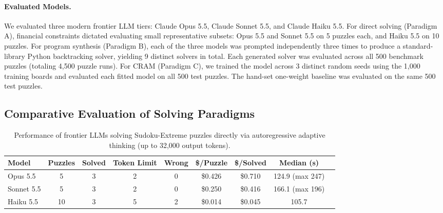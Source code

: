 \documentclass{article} %
\begin{document}
\paragraph{Evaluated Models.}
We evaluated three modern frontier LLM tiers: Claude Opus 5.5, Claude Sonnet 5.5, and Claude Haiku 5.5.
For direct solving (Paradigm A), financial constraints dictated evaluating small representative subsets: Opus 5.5 and Sonnet 5.5 on 5 puzzles each, and Haiku 5.5 on 10 puzzles.
For program synthesis (Paradigm B), each of the three models was prompted independently three times to produce a standard-library Python backtracking solver, yielding 9 distinct solvers in total. Each generated solver was evaluated across all 500 benchmark puzzles (totaling 4,500 puzzle runs).
For CRAM (Paradigm C), we trained the model across 3 distinct random seeds using the 1,000 training boards and evaluated each fitted model on all 500 test puzzles. The hand-set one-weight baseline was evaluated on the same 500 test puzzles.

\subsection{Comparative Evaluation of Solving Paradigms}
\label{sec:exp_comparison}

\begin{table}[t]
\caption{Performance of frontier LLMs solving Sudoku-Extreme puzzles directly via autoregressive adaptive thinking (up to 32,000 output tokens).}
\label{tab:llm_direct}
\begin{center}
\begin{tabular}{lcccccccc}
\toprule
\textbf{Model} & \textbf{Puzzles} & \textbf{Solved} & \textbf{Token Limit} & \textbf{Wrong} & \textbf{\$/Puzzle} & \textbf{\$/Solved} & \textbf{Median (s)} \\
\midrule
Opus 5.5   & 5  & 3 & 2 & 0 & \$0.426 & \$0.710 & 124.9 (max 247) \\
Sonnet 5.5 & 5  & 3 & 2 & 0 & \$0.250 & \$0.416 & 166.1 (max 196) \\
Haiku 5.5  & 10 & 3 & 5 & 2 & \$0.014 & \$0.045 & 105.7 \\
\bottomrule
\end{tabular}
\end{center}
\end{table}
\end{document}

